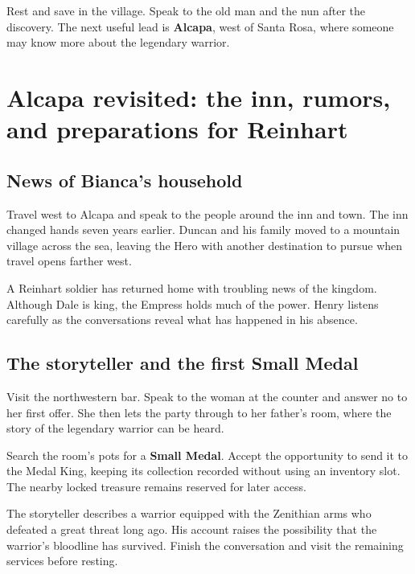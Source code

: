 Rest and save in the village. Speak to the old man and the nun after
the discovery. The next useful lead is \textbf{Alcapa}, west of Santa
Rosa, where someone may know more about the legendary warrior.

\section{Alcapa revisited: the inn, rumors, and preparations for Reinhart}

\subsection*{News of Bianca's household}

Travel west to Alcapa and speak to the people around the inn and town.
The inn changed hands seven years earlier. Duncan and his family moved
to a mountain village across the sea, leaving the Hero with another
destination to pursue when travel opens farther west.

A Reinhart soldier has returned home with troubling news of the kingdom.
Although Dale is king, the Empress holds much of the power. Henry listens
carefully as the conversations reveal what has happened in his absence.

\subsection*{The storyteller and the first Small Medal}

Visit the northwestern bar. Speak to the woman at the counter and answer
no to her first offer. She then lets the party through to her father's
room, where the story of the legendary warrior can be heard.

Search the room's pots for a \textbf{Small Medal}. Accept the opportunity
to send it to the Medal King, keeping its collection recorded without
using an inventory slot. The nearby locked treasure remains reserved
for later access.


The storyteller describes a warrior equipped with the Zenithian arms
who defeated a great threat long ago. His account raises the possibility
that the warrior's bloodline has survived. Finish the conversation and
visit the remaining services before resting.

